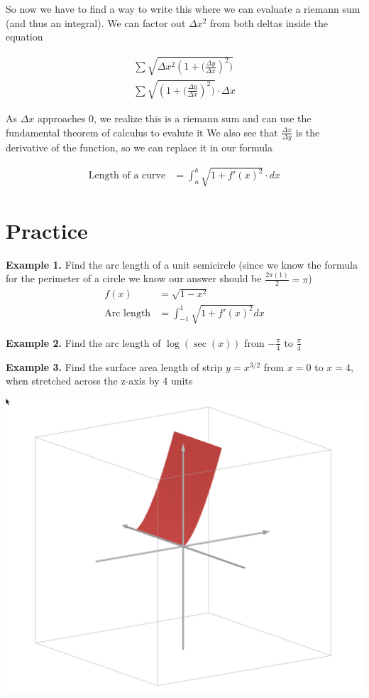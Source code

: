 \documentclass[12pt]{extarticle}
\begin{document}
So now we have to find a way to write this where we can evaluate a riemann sum (and thus an integral).
We can factor out $\Delta x^2$ from both deltas inside the equation

\begin{align}   
    \sum \sqrt{{\Delta x^2}(1 + {(\frac{\Delta y}{\Delta x}})^2)} \\
    \sum \sqrt{(1 + {(\frac{\Delta y}{\Delta x}})^2)} \cdot \Delta x
\end{align}

As $\Delta x$ approaches 0, we realize this is a riemann sum and can use the fundamental theorem of calculus to evalute it 
We also see that $\frac{\Delta x}{\Delta y}$ is the derivative of the function, so we can replace it in our formula

\begin{align}
    \text{Length of a curve} &= \int_{a}^{b} \sqrt{1 + f'(x)^2} \cdot dx
\end{align}

\section{Practice}
\textbf{Example 1.} Find the arc length of a unit semicircle (since we know the formula for the perimeter of a circle we know our answer should be $\frac{2\pi (1)}{2} = \pi$)
\begin{align}
    f(x) &= \sqrt{1-x^2} \\
    \text{Arc length} &= \int_{-1}^{1} \sqrt{1 + f'(x)^2} dx 
\end{align}

\begin{center}
\end{center}

\vspace{0.5cm}

\textbf{Example 2.} Find the arc length of $\log(\sec(x))$ from $-\frac{\pi}{4}$ to $\frac{\pi}{4}$

\vspace{10cm}

\textbf{Example 3.} Find the surface area length of strip $y = x^{3/2} $ from $x = 0$ to $x= 4$, when stretched across the z-axis by 4 units

\begin{center}
    \includegraphics[height = 0.4\textwidth]{Surface.png}
\end{center}
\end{document}
